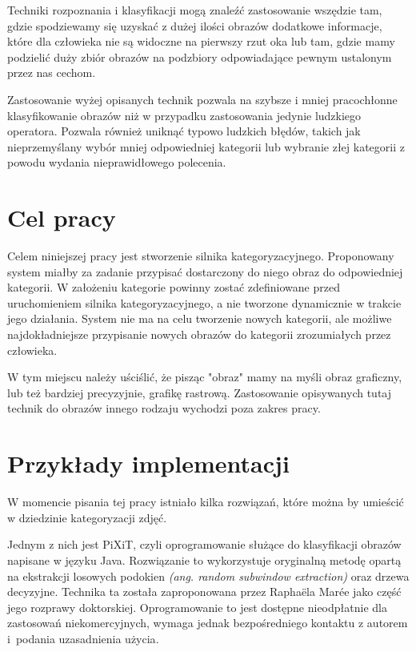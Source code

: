 Techniki rozpoznania i klasyfikacji mogą znaleźć zastosowanie wszędzie tam, gdzie spodziewamy się uzyskać z dużej ilości obrazów dodatkowe informacje, które dla człowieka nie są widoczne na pierwszy rzut oka lub tam, gdzie mamy podzielić duży zbiór obrazów na podzbiory odpowiadające pewnym ustalonym przez nas cechom.

Zastosowanie wyżej opisanych technik pozwala na szybsze i mniej pracochłonne klasyfikowanie obrazów niż w przypadku zastosowania jedynie ludzkiego operatora. Pozwala również uniknąć typowo ludzkich błędów, takich jak nieprzemyślany wybór mniej odpowiedniej kategorii lub wybranie złej kategorii z powodu wydania nieprawidłowego polecenia.

\section*{Cel pracy}
Celem niniejszej pracy jest stworzenie silnika kategoryzacyjnego. Proponowany system miałby za zadanie przypisać dostarczony do niego obraz do odpowiedniej kategorii. W założeniu kategorie powinny zostać zdefiniowane przed uruchomieniem silnika kategoryzacyjnego, a nie tworzone dynamicznie w trakcie jego działania. System nie ma na celu tworzenie nowych kategorii, ale możliwe najdokładniejsze przypisanie nowych obrazów do kategorii zrozumiałych przez człowieka.

W tym miejscu należy uściślić, że pisząc "obraz" mamy na myśli obraz graficzny, lub też bardziej precyzyjnie, grafikę rastrową. Zastosowanie opisywanych tutaj technik do obrazów innego rodzaju wychodzi poza zakres pracy.

\section*{Przykłady implementacji}
W momencie pisania tej pracy istniało kilka rozwiązań, które można by umieścić w dziedzinie kategoryzacji zdjęć.

Jednym z nich jest PiXiT, czyli oprogramowanie służące do klasyfikacji obrazów napisane w języku Java. Rozwiązanie to wykorzystuje oryginalną metodę opartą na ekstrakcji losowych podokien \emph{(ang. random subwindow extraction)} oraz drzewa decyzyjne. Technika ta została zaproponowana przez Raphaëla Marée jako część jego rozprawy doktorskiej. Oprogramowanie to jest dostępne nieodpłatnie dla zastosowań niekomercyjnych, wymaga jednak bezpośredniego kontaktu z autorem i~podania uzasadnienia użycia\cite{PIXIT}.

